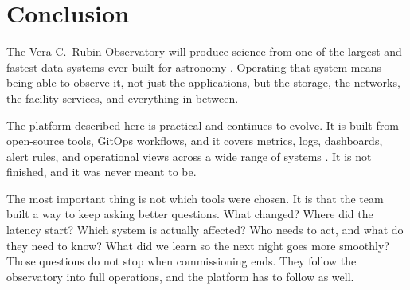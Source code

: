 \section{Conclusion}

The Vera C.\ Rubin Observatory will produce science from one of the largest and fastest data
systems ever built for astronomy \cite{2019ApJ...873..111I}. Operating that
system means being able to observe it, not just the applications, but the storage, the networks,
the facility services, and everything in between.

The platform described here is practical and continues to evolve. It is built from open-source
tools, GitOps workflows, and it covers metrics, logs, dashboards, alert
rules, and operational views across a wide range of systems
\cite{lsst-it-k8s-cookbook}. It is not finished, and it was
never meant to be.

The most important thing is not which tools were chosen. It is that the team built a way to keep
asking better questions. What changed? Where did the latency start? Which system is actually
affected? Who needs to act, and what do they need to know? What did we learn so the next night
goes more smoothly? Those questions do not stop when commissioning ends. They follow the
observatory into full operations, and the platform has to follow as well.
